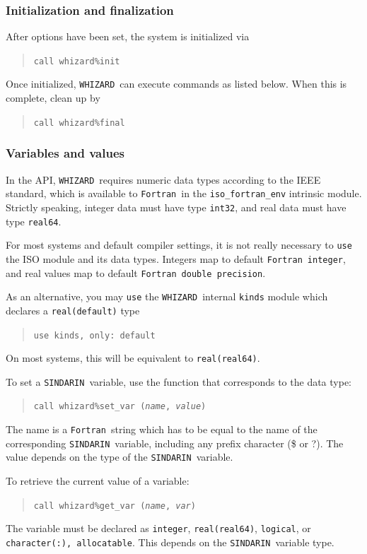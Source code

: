\documentclass[12pt]{book}
\newcommand{\ttt}[1]{\texttt{#1}}
\newcommand{\whizard}{\ttt{WHIZARD}}
\newcommand{\sindarin}{\ttt{SINDARIN}}
\newcommand{\fortran}{\ttt{Fortran}}
\begin{document}
\subsubsection{Initialization and finalization}
After options have been set, the system is initialized via
\begin{quote}
  \tt call whizard\%init
\end{quote}
Once initialized, \whizard\ can execute commands as listed below.  When this
is complete, clean up by
\begin{quote}
  \tt call whizard\%final
\end{quote}

\subsubsection{Variables and values}

In the API, \whizard\ requires numeric data types according to the IEEE
standard, which is available to \fortran\ in the \ttt{iso\_fortran\_env}
intrinsic module.  Strictly speaking, integer data must have type \ttt{int32},
and real data must have type \ttt{real64}.

For most systems and default compiler settings, it
is not really necessary to \ttt{use} the ISO module and its data types.
Integers map to default \fortran\ \ttt{integer},
and real values map to default \fortran\ \ttt{double precision}.

As an
alternative, you may \ttt{use} the \whizard\ internal \ttt{kinds} module which
declares a \ttt{real(default)} type
\begin{quote}
  \tt use kinds, only: default
\end{quote}
On most systems, this will be equivalent
to \ttt{real(real64)}.

To set a \sindarin\ variable, use the function that corresponds to the data
type:
\begin{quote}
  \tt call whizard\%set\_var (\textit{name}, \textit{value})
\end{quote}
The name is a \fortran\ string which has to be equal to the name of the
corresponding \sindarin\ variable, including any prefix character (\$ or ?).
The value depends on the type of the \sindarin\
variable.

To retrieve the current value of a variable:
\begin{quote}
  \tt call whizard\%get\_var (\textit{name}, \textit{var})
\end{quote}
The variable must be declared as \ttt{integer}, \ttt{real(real64)},
\ttt{logical},  or
\ttt{character(:), allocatable}.  This depends on the \sindarin\ variable type.
\end{document}
